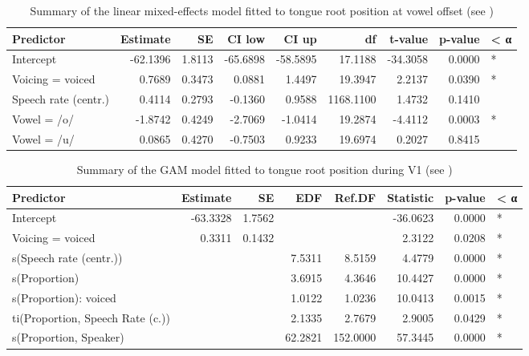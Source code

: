 \documentclass[preprint]{JASAnew}
\begin{document}
\begin{table}

\caption{\label{tab:tra-lm-table}Summary of the linear mixed-effects model fitted to tongue root position at vowel offset (see )}
\centering
\fontsize{10}{12}\selectfont
\begin{tabular}[t]{lrrrrrrrl}
\toprule
Predictor & Estimate & SE & CI low & CI up & df & t-value & p-value & < α\\
\midrule
Intercept & -62.1396 & 1.8113 & -65.6898 & -58.5895 & 17.1188 & -34.3058 & 0.0000 & *\\
Voicing = voiced & 0.7689 & 0.3473 & 0.0881 & 1.4497 & 19.3947 & 2.2137 & 0.0390 & *\\
Speech rate (centr.) & 0.4114 & 0.2793 & -0.1360 & 0.9588 & 1168.1100 & 1.4732 & 0.1410 & \\
Vowel = /o/ & -1.8742 & 0.4249 & -2.7069 & -1.0414 & 19.2874 & -4.4112 & 0.0003 & *\\
Vowel = /u/ & 0.0865 & 0.4270 & -0.7503 & 0.9233 & 19.6974 & 0.2027 & 0.8415 & \\
\bottomrule
\end{tabular}
\end{table}

\begin{table}

\caption{\label{tab:tra-gam-ar-table}Summary of the GAM model fitted to tongue root position during V1 (see )}
\centering
\fontsize{10}{12}\selectfont
\begin{tabular}[t]{lrrrrrrl}
\toprule
Predictor & Estimate & SE & EDF & Ref.DF & Statistic & p-value & < α\\
\midrule
Intercept & -63.3328 & 1.7562 &  &  & -36.0623 & 0.0000 & *\\
Voicing = voiced & 0.3311 & 0.1432 &  &  & 2.3122 & 0.0208 & *\\
s(Speech rate (centr.)) &  &  & 7.5311 & 8.5159 & 4.4779 & 0.0000 & *\\
s(Proportion) &  &  & 3.6915 & 4.3646 & 10.4427 & 0.0000 & *\\
s(Proportion): voiced &  &  & 1.0122 & 1.0236 & 10.0413 & 0.0015 & *\\
ti(Proportion, Speech Rate (c.)) &  &  & 2.1335 & 2.7679 & 2.9005 & 0.0429 & *\\
s(Proportion, Speaker) &  &  & 62.2821 & 152.0000 & 57.3445 & 0.0000 & *\\
\bottomrule
\end{tabular}
\end{table}
\end{document}

